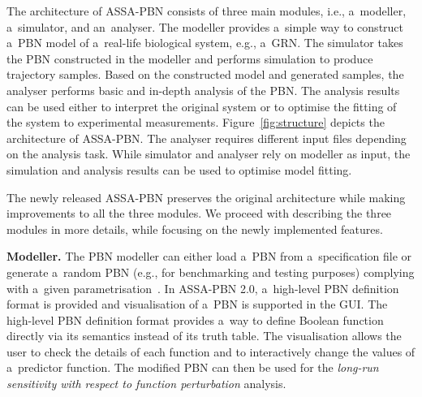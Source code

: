 \documentclass[runningheads,a4paper]{llncs}
\begin{document}
The architecture of {\sf ASSA-PBN} consists of three main modules, i.e., a~modeller, a~simulator, and an~analyser.
The modeller provides a~simple way to construct a~PBN model of a~real-life biological system,
e.g., a~GRN.
The simulator takes the PBN constructed in the modeller and performs
simulation to produce trajectory samples.
Based on the constructed model and generated samples,
the analyser performs basic and in-depth analysis of the PBN.
The analysis results can be used either to interpret the original system or to optimise the
fitting of the system to experimental measurements.
Figure~\ref{fig:structure} depicts the architecture of {\sf ASSA-PBN}.
The analyser requires different input files depending on the analysis task.
While simulator and analyser rely on modeller as input,
the simulation and analysis results can be used to optimise model fitting.

The newly released {\sf ASSA-PBN} preserves the original architecture while making improvements to
all the three modules. We proceed with describing the three modules in more details, while
focusing on the newly implemented features.

\medskip\noindent
{\bf Modeller.}
The PBN modeller can either load a~PBN from a~specification file or generate a~random PBN
(e.g., for benchmarking and testing purposes)
complying with a~given parametrisation~\cite{assa}.
In {\sf ASSA-PBN} 2.0, a~high-level PBN definition format is provided and visualisation of a~PBN
is supported in the GUI.
The high-level PBN definition format provides a~way to define Boolean function directly via its
semantics instead of its truth table. The visualisation allows the user to check the details of
each function and to interactively change the values of a~predictor function. The modified PBN can
then be used for the \textit{long-run sensitivity with respect to function perturbation} analysis.
\end{document}
